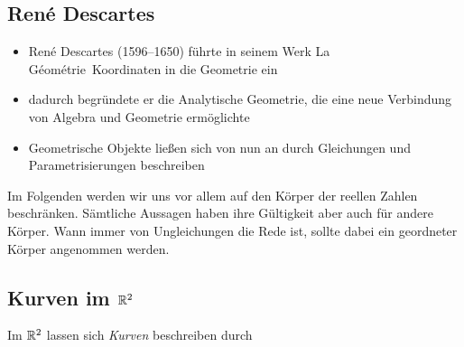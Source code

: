 \subsection*{René Descartes}

\begin{itemize}
\item René Descartes (1596--1650) führte in seinem Werk \glqq La Géométrie\grqq\ Koordinaten in die
Geometrie ein
\item dadurch begründete er die \glqq Analytische Geometrie\grqq , die eine neue Verbindung von
Algebra und Geometrie ermöglichte
\item Geometrische Objekte ließen sich von nun an durch Gleichungen und Parametrisierungen
beschreiben
\end{itemize}

Im Folgenden werden wir uns vor allem auf den Körper der reellen Zahlen beschränken. Sämtliche
Aussagen %
haben ihre Gültigkeit aber auch für andere Körper. Wann immer von Ungleichungen die Rede ist, sollte
dabei ein geordneter Körper angenommen werden.

\subsection*{Kurven im $\mathbb R^2$}

Im $\mathbb R^2$ lassen sich {\em Kurven} beschreiben durch

